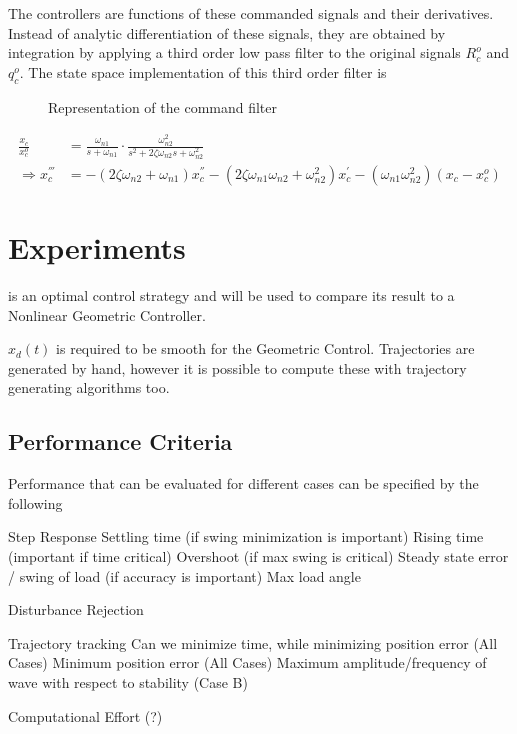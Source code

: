 The controllers are functions of these commanded signals and their derivatives. Instead of analytic differentiation of these signals, they are obtained by integration by applying a third order low pass filter to the original signals $ R_c^o $ and $ q_c^o $. 
The state space implementation of this third order filter is \cite{Djapic2008}

\begin{figure}[h!]
	\centering
	\caption{Representation of the command filter\label{fig:set.CF}}
\end{figure}		

\begin{align}\label{eq:CF}
\frac{x_c}{x_c^o}&=\frac{\omega_{n1}}{s+\omega_{n1}}\cdot\frac{\omega_{n2}^2}{s^2+2\zeta\omega_{n2}s+\omega_{n2}^2}\\
\Rightarrow x_c^{'''}&=-(2\zeta\omega_{n2}+\omega_{n1})x_c^{''}-(2\zeta\omega_{n1}\omega_{n2}+\omega_{n2}^2)x_c^{'}-(\omega_{n1}\omega_{n2} ^2)(x_c-x_c^o)
\end{align}

\section{Experiments}\label{sec:set.exp}

 is an optimal control strategy and will be used to compare its result to a Nonlinear Geometric Controller.

$ x_d(t) $ is required to be smooth for the Geometric Control. Trajectories are generated by hand, however it is possible to compute these with trajectory generating algorithms too.

\subsection{Performance Criteria}
Performance  that can be evaluated for different cases can be specified by the following
\begin{outline}
	\1 Step Response
	\2 Settling time (if swing minimization is important)
	\2 Rising time (important if time critical)
	\2 Overshoot (if max swing is critical)
	\2 Steady state error / swing of load (if accuracy is important)
	\2 Max load angle
	
	\1 Disturbance Rejection
	
	\1 Trajectory tracking
	\2 Can we minimize time, while minimizing position error (All Cases)
	\2 Minimum position error (All Cases)
	\2 Maximum amplitude/frequency of wave with respect to stability (Case B)
	
	\1 Computational Effort (?)
\end{outline}

